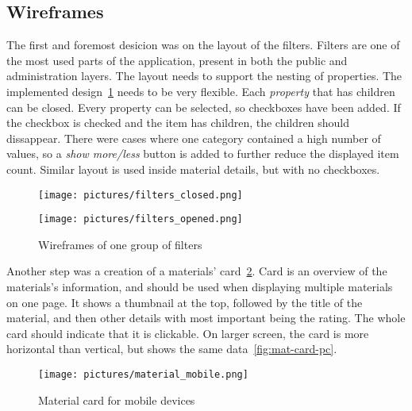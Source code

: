 \documentclass[
  digital,     %
  oneside,     %
  nosansbold,  %
  colorbold, %
  lof,         %
  lot,         %
]{fithesis4}
\begin{document}
\subsection{Wireframes}

The first and foremost desicion was on the layout of the filters. Filters are one of the most used parts of the application, present in both the public and administration layers. The layout needs to support the nesting of properties. The implemented design~\ref{fig:filters} needs to be very flexible. Each \textit{property} that has children can be closed. Every property can be selected, so checkboxes have been added. If the checkbox is checked and the item has children, the children should dissappear. There were cases where one category contained a high number of values, so a \textit{show more/less} button is added to further reduce the displayed item count. Similar layout is used inside material details, but with no checkboxes.

\begin{figure}
	\begin{center}
		\begin{minipage}{.3\textwidth}
			\texttt{[image: pictures/filters\_closed.png]}
		\end{minipage}
		\begin{minipage}{.3\textwidth}
			\texttt{[image: pictures/filters\_opened.png]}
		\end{minipage}
	\end{center}
	\caption{Wireframes of one group of filters}
	\label{fig:filters}
\end{figure}

Another step was a creation of a materials' card~\ref{fig:mat-card-mobile}. Card is an overview of the materials's information, and should be used when displaying multiple materials on one page. It shows a thumbnail at the top, followed by the title of the material, and then other details with most important being the rating. The whole card should indicate that it is clickable.  On larger screen, the card is more horizontal than vertical, but shows the same data~\ref{fig:mat-card-pc}.

\begin{figure}
	\begin{center}
		\begin{minipage}{.35\textwidth}
			\texttt{[image: pictures/material\_mobile.png]}
		\end{minipage}
	\end{center}
	\caption{Material card for mobile devices}
	\label{fig:mat-card-mobile}
\end{figure}
\end{document}
